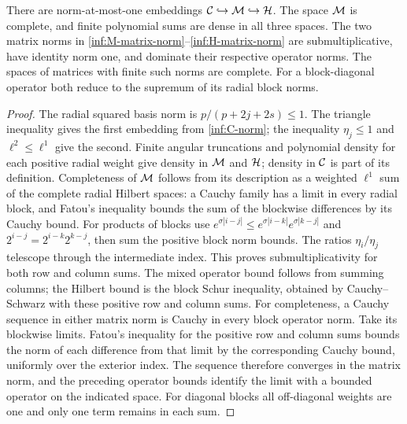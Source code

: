 \begin{lemma}\label{inf:mixed-algebra}
There are norm-at-most-one embeddings
$\mathcal C\hookrightarrow\mathcal M\hookrightarrow\mathcal{H}$.
The space $\mathcal M$ is complete, and finite polynomial sums are
dense in all three spaces.
The two matrix norms in
\eqref{inf:M-matrix-norm}--\eqref{inf:H-matrix-norm} are
submultiplicative, have identity norm one, and dominate their
respective operator norms. The spaces of matrices with finite such
norms are complete. For a block-diagonal operator both reduce
to the supremum of its radial block norms.
\end{lemma}
\begin{proof}
The radial squared basis norm is
$p/(p+2j+2s)\le1$. The triangle inequality gives the first
embedding from \eqref{inf:C-norm}; the inequality $\eta_j\le1$
and $\ell^2\le\ell^1$ give the second.
Finite angular truncations and polynomial density for each positive
radial weight give density in $\mathcal M$ and $\mathcal{H}$; density in
$\mathcal C$ is part of its definition. Completeness of $\mathcal M$ follows
from its description as a weighted $\ell^1$ sum of the complete
radial Hilbert spaces: a Cauchy family has a limit in every
radial block, and Fatou's inequality bounds the sum of the
blockwise differences by its Cauchy bound.
For products of blocks use
$e^{\sigma|i-j|}\le e^{\sigma|i-k|}e^{\sigma|k-j|}$ and
$2^{i-j}=2^{i-k}2^{k-j}$, then sum the positive block norm bounds.
The ratios $\eta_i/\eta_j$ telescope through the intermediate
index. This proves submultiplicativity for both row and column
sums. The mixed operator bound follows from summing columns;
the Hilbert bound is the block Schur inequality, obtained by
Cauchy--Schwarz with these positive row and column sums.
For completeness, a Cauchy sequence in either matrix norm is
Cauchy in every block operator norm. Take its blockwise limits.
Fatou's inequality for the positive row and column sums bounds
the norm of each difference from that limit by the corresponding
Cauchy bound, uniformly over the exterior index. The sequence
therefore converges in the matrix norm, and the preceding operator
bounds identify the limit with a bounded operator on the indicated
space. For diagonal blocks all off-diagonal weights are one and
only one term remains in each sum.
\end{proof}

